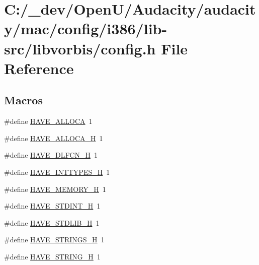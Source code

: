 \hypertarget{mac_2config_2i386_2lib-src_2libvorbis_2config_8h}{}\section{C\+:/\+\_\+dev/\+Open\+U/\+Audacity/audacity/mac/config/i386/lib-\/src/libvorbis/config.h File Reference}
\label{mac_2config_2i386_2lib-src_2libvorbis_2config_8h}
\subsection*{Macros}
\begin{DoxyCompactItemize}
\item 
\#define \hyperlink{mac_2config_2i386_2lib-src_2libvorbis_2config_8h_aaf5250164f8a3c52b7820317aee7d9ce}{H\+A\+V\+E\+\_\+\+A\+L\+L\+O\+CA}~1
\item 
\#define \hyperlink{mac_2config_2i386_2lib-src_2libvorbis_2config_8h_a277c3d138498b9267fe43589b6b7d91e}{H\+A\+V\+E\+\_\+\+A\+L\+L\+O\+C\+A\+\_\+H}~1
\item 
\#define \hyperlink{mac_2config_2i386_2lib-src_2libvorbis_2config_8h_a0ee1617ff2f6885ef384a3dd46f9b9d7}{H\+A\+V\+E\+\_\+\+D\+L\+F\+C\+N\+\_\+H}~1
\item 
\#define \hyperlink{mac_2config_2i386_2lib-src_2libvorbis_2config_8h_ab90a030ff2790ebdc176660a6dd2a478}{H\+A\+V\+E\+\_\+\+I\+N\+T\+T\+Y\+P\+E\+S\+\_\+H}~1
\item 
\#define \hyperlink{mac_2config_2i386_2lib-src_2libvorbis_2config_8h_ae93a78f9d076138897af441c9f86f285}{H\+A\+V\+E\+\_\+\+M\+E\+M\+O\+R\+Y\+\_\+H}~1
\item 
\#define \hyperlink{mac_2config_2i386_2lib-src_2libvorbis_2config_8h_ab6cd6d1c63c1e26ea2d4537b77148354}{H\+A\+V\+E\+\_\+\+S\+T\+D\+I\+N\+T\+\_\+H}~1
\item 
\#define \hyperlink{mac_2config_2i386_2lib-src_2libvorbis_2config_8h_a9e0e434ec1a6ddbd97db12b5a32905e0}{H\+A\+V\+E\+\_\+\+S\+T\+D\+L\+I\+B\+\_\+H}~1
\item 
\#define \hyperlink{mac_2config_2i386_2lib-src_2libvorbis_2config_8h_a405d10d46190bcb0320524c54eafc850}{H\+A\+V\+E\+\_\+\+S\+T\+R\+I\+N\+G\+S\+\_\+H}~1
\item 
\#define \hyperlink{mac_2config_2i386_2lib-src_2libvorbis_2config_8h_ad4c234dd1625255dc626a15886306e7d}{H\+A\+V\+E\+\_\+\+S\+T\+R\+I\+N\+G\+\_\+H}~1
\item 

\end{DoxyCompactItemize}
